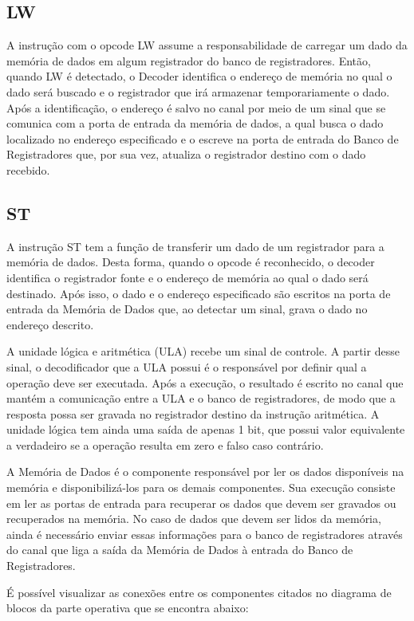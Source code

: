 \documentclass[12pt]{article}
\begin{document}
\subsection{LW}
A instrução com o opcode LW assume a responsabilidade de carregar um dado da memória de dados em algum registrador do banco de registradores. Então, quando LW é detectado, o Decoder identifica o endereço de memória no qual o dado será buscado e o registrador que irá armazenar temporariamente o dado. Após a identificação, o endereço é salvo no canal por meio de um sinal que se comunica com a porta de entrada da memória de dados, a qual busca o dado localizado no endereço especificado e o escreve na porta de entrada do Banco de Registradores que, por sua vez, atualiza o registrador destino com o dado recebido.

\subsection{ST}
A instrução ST tem a função de transferir um dado de um registrador para a memória de dados. Desta forma, quando o opcode é reconhecido, o decoder identifica o registrador fonte e o endereço de memória ao qual o dado será destinado. Após isso, o dado e o endereço especificado são escritos na porta de entrada da Memória de Dados que, ao detectar um sinal, grava o dado no endereço descrito.

A unidade lógica e aritmética (ULA) recebe um sinal de controle. A partir desse sinal, o decodificador que a ULA possui é o responsável por definir qual a operação deve ser executada. Após a execução, o resultado é escrito no canal que mantém a comunicação entre a ULA e o banco de registradores, de modo que a resposta possa ser gravada no registrador destino da instrução aritmética. A unidade lógica tem ainda uma saída de apenas 1 bit, que possui valor equivalente a verdadeiro se a operação resulta em zero e falso caso contrário.

A Memória de Dados é o componente responsável por ler os dados disponíveis na memória e disponibilizá-los para os demais componentes. Sua execução consiste em ler as portas de entrada para recuperar os dados que devem ser gravados ou recuperados na memória. No caso de dados que devem ser lidos da memória, ainda é necessário enviar essas informações para o banco de registradores através do canal que liga a saída da Memória de Dados à entrada do Banco de Registradores.

    É possível visualizar as conexões entre os componentes citados no diagrama de blocos da parte operativa que se encontra abaixo:
\end{document}
